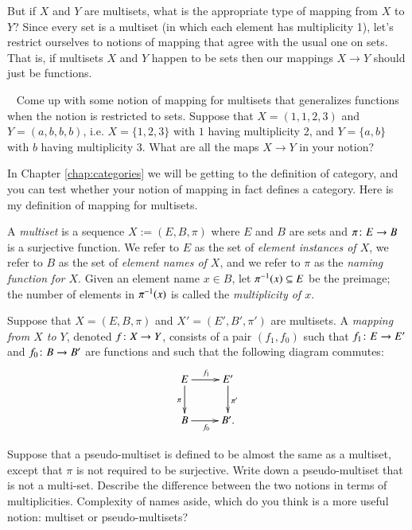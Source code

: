 But if $X$ and $Y$ are multisets, what is the appropriate type of mapping from $X$ to $Y$? Since every set is a multiset (in which each element has multiplicity 1), let's restrict ourselves to notions of mapping that agree with the usual one on sets. That is, if multisets $X$ and $Y$ happen to be sets then our mappings $X\to Y$ should just be functions.

\begin{exercise}\label{exc:multiset 1}~
\sexc Come up with some notion of mapping for multisets that generalizes functions when the notion is restricted to sets. 
\next Suppose that $X=(1,1,2,3)$ and $Y=(a,b,b,b)$, i.e. $X=\{1,2,3\}$ with $1$ having multiplicity 2, and $Y=\{a,b\}$ with $b$ having multiplicity 3. What are all the maps $X\to Y$ in your notion?
\endsexc
\end{exercise}

In Chapter \ref{chap:categories} we will be getting to the definition of category, and you can test whether your notion of mapping in fact defines a category. Here is my definition of mapping for multisets.

\begin{definition}\label{def:multiset}

A {\em multiset} is a sequence $X:=(E,B,\pi)$ where $E$ and $B$ are sets and $\pi\colon E\rightarrow B$ is a surjective function. We refer to $E$ as the set of {\em element instances of $X$}, we refer to $B$ as the set of {\em element names of $X$}, and we refer to $\pi$ as the {\em naming function for $X$}. Given an element name $x\in B$, let $\pi^\m1(x)\ss E$ be the preimage; the number of elements in $\pi^\m1(x)$ is called the {\em multiplicity of $x$}.

Suppose that $X=(E,B,\pi)$ and $X'=(E',B',\pi')$ are multisets. A {\em mapping from $X$ to $Y$}, denoted $f\colon X\rightarrow Y$, consists of a pair $(f_1,f_0)$ such that $f_1\colon E\rightarrow E'$ and $f_0\colon B\rightarrow B'$ are functions and such that the following diagram commutes:
\begin{align}\label{dia:multiset map}
\xymatrix{E\ar[r]^{f_1}\ar[d]_{\pi}&E'\ar[d]^{\pi'}\\B\ar[r]_{f_0}&B'.}
\end{align}

\end{definition}

\begin{exercise}
Suppose that a pseudo-multiset is defined to be almost the same as a multiset, except that $\pi$ is not required to be surjective. 
\sexc Write down a pseudo-multiset that is not a multi-set. 
\next Describe the difference between the two notions in terms of multiplicities. 
\next Complexity of names aside, which do you think is a more useful notion: multiset or pseudo-multisets? 
\endsexc
\end{exercise}


